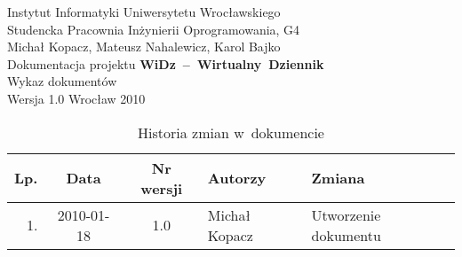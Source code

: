 \documentclass[12pt,leqno,twoside]{mwart}
\begin{document}
\begin{titlepage}
\begin{center}
Instytut Informatyki Uniwersytetu Wrocławskiego \\
Studencka Pracownia Inżynierii Oprogramowania, G4 \\
\vspace{4cm}
\Large Michał Kopacz, Mateusz Nahalewicz, Karol Bajko \\
\vspace{0.5cm}
\huge Dokumentacja projektu \mbox{\textbf{WiDz -- Wirtualny Dziennik}} \\ \Large Wykaz dokumentów\\
\vspace{1cm}
\normalsize Wersja 1.0
\vfill
\normalsize Wrocław 2010
\end{center}
\end{titlepage}

\newpage

\begin{table}
	\centering
	\caption{Historia zmian w~dokumencie}
		\begin{tabular}{|r|c|c|l|l|}
		\hline
		Lp. 	& Data       & Nr wersji 	& Autorzy           		& Zmiana \\ \hline
		1.   	& 2010-01-18 & 1.0       	& Michał Kopacz & Utworzenie dokumentu \\ \hline
		\end{tabular}
\end{table}
\end{document}
